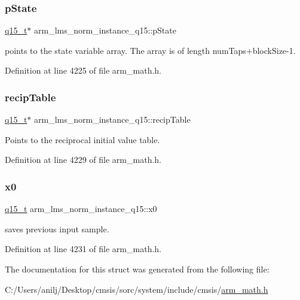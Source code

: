 \subsubsection{\texorpdfstring{p\+State}{pState}}
{\footnotesize\ttfamily \hyperlink{arm__math_8h_ab5a8fb21a5b3b983d5f54f31614052ea}{q15\+\_\+t}$\ast$ arm\+\_\+lms\+\_\+norm\+\_\+instance\+\_\+q15\+::p\+State}

points to the state variable array. The array is of length num\+Taps+block\+Size-\/1. 

Definition at line 4225 of file arm\+\_\+math.\+h.

\mbox{\label{structarm__lms__norm__instance__q15_a9aabb0e4c79f3db807e7a441fa36f5f8}} 
\subsubsection{\texorpdfstring{recip\+Table}{recipTable}}
{\footnotesize\ttfamily \hyperlink{arm__math_8h_ab5a8fb21a5b3b983d5f54f31614052ea}{q15\+\_\+t}$\ast$ arm\+\_\+lms\+\_\+norm\+\_\+instance\+\_\+q15\+::recip\+Table}

Points to the reciprocal initial value table. 

Definition at line 4229 of file arm\+\_\+math.\+h.

\mbox{\label{structarm__lms__norm__instance__q15_a3fc1d6f97d2c6d5324871de6895cb7e9}} 
\subsubsection{\texorpdfstring{x0}{x0}}
{\footnotesize\ttfamily \hyperlink{arm__math_8h_ab5a8fb21a5b3b983d5f54f31614052ea}{q15\+\_\+t} arm\+\_\+lms\+\_\+norm\+\_\+instance\+\_\+q15\+::x0}

saves previous input sample. 

Definition at line 4231 of file arm\+\_\+math.\+h.



The documentation for this struct was generated from the following file\+:\begin{DoxyCompactItemize}
\item 
C\+:/\+Users/anilj/\+Desktop/cmsis/sorc/system/include/cmsis/\hyperlink{arm__math_8h}{arm\+\_\+math.\+h}\end{DoxyCompactItemize}
